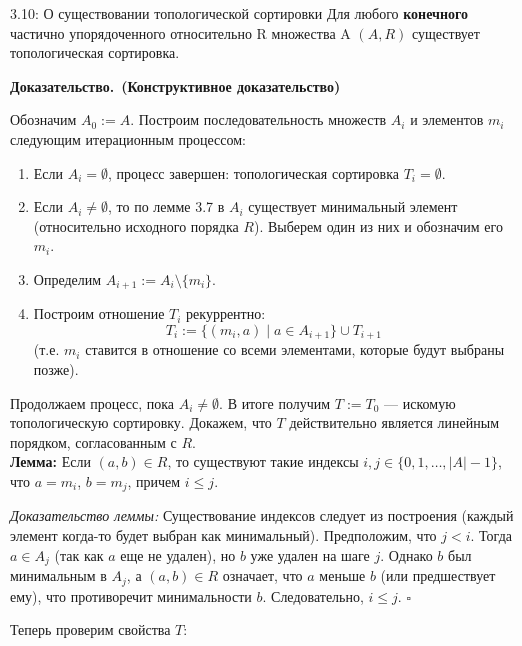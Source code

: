 \documentclass[a4paper,12pt]{article}
\newcommand{\myproof}{\textbf{Доказательство.}\ }
\begin{document}
	\begin{theorembox}{3.10: О существовании топологической сортировки}
		Для любого \textbf{конечного} частично упорядоченного относительно R множества A $(A, R)$ существует топологическая сортировка.
	\end{theorembox}
	
	\myproof \textbf{(Конструктивное доказательство)}
	
	Обозначим $A_0 := A$. Построим последовательность множеств $A_i$ и элементов $m_i$ следующим итерационным процессом:
	
	\begin{enumerate}
		\item Если $A_i = \emptyset$, процесс завершен: топологическая сортировка $T_i = \emptyset$.
		\item Если $A_i \neq \emptyset$, то по лемме 3.7 в $A_i$ существует минимальный элемент (относительно исходного порядка $R$). Выберем один из них и обозначим его $m_i$.
		\item Определим $A_{i+1} := A_i \setminus \{m_i\}$.
		\item Построим отношение $T_i$ рекуррентно:
		\[ T_i := \{(m_i, a) \mid a \in A_{i+1}\} \cup T_{i+1} \]
		(т.е. $m_i$ ставится в отношение со всеми элементами, которые будут выбраны позже).
	\end{enumerate}
	
	Продолжаем процесс, пока $A_i \neq \emptyset$. В итоге получим $T := T_0$ — искомую топологическую сортировку. Докажем, что $T$ действительно является линейным порядком, согласованным с $R$.\\
	
	
	\textbf{Лемма:} Если $(a, b) \in R$, то существуют такие индексы $i, j \in \{0, 1, \dots, |A|-1\}$, что $a = m_i$, $b = m_j$, причем $i \le j$.
	
	\textit{Доказательство леммы:} Существование индексов следует из построения (каждый элемент когда-то будет выбран как минимальный). Предположим, что $j < i$. Тогда $a \in A_j$ (так как $a$ еще не удален), но $b$ уже удален на шаге $j$. Однако $b$ был минимальным в $A_j$, а $(a, b) \in R$ означает, что $a$ меньше $b$ (или предшествует ему), что противоречит минимальности $b$. Следовательно, $i \le j$. $\square$
	
	Теперь проверим свойства $T$:
	
\end{document}

